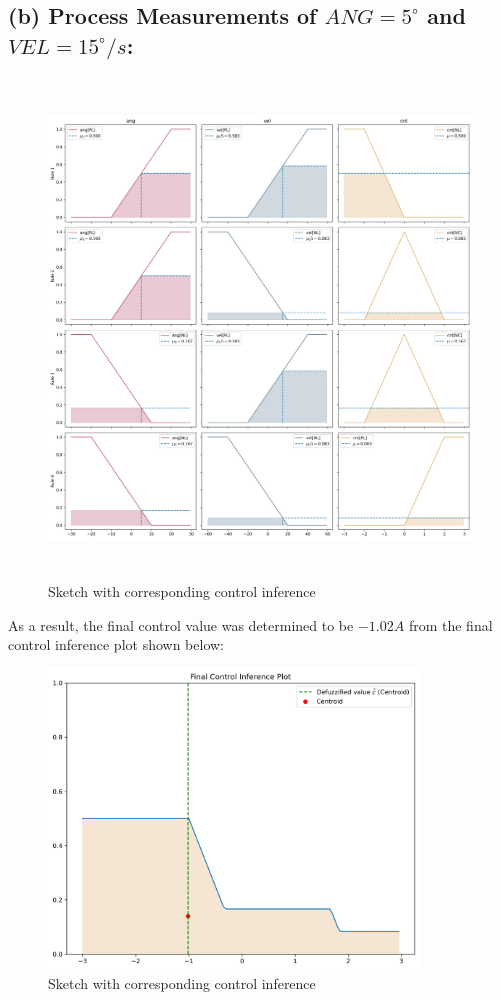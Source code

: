 \documentclass{tron}
\begin{document}
\subsection{(b) Process Measurements of $ANG = 5^{\circ}$ and $VEL = 15^{\circ}/s$:}
\begin{figure}[H]
	\centering
	\includegraphics[height=500px]{../src_code/output/P6/plot_Control Inference}
	\caption{Sketch with corresponding control inference}
	\label{fig:p5:n}
\end{figure}

\clearpage
As a result, the final control value was determined to be $-1.02A$ from the final control inference plot shown below:
\begin{figure}[H]
	\centering
	\includegraphics[height=300px]{../src_code/output/P6/plot_final_control_Control Inference}
	\caption{Sketch with corresponding control inference}
	\label{fig:p5:n}
\end{figure}
\end{document}
